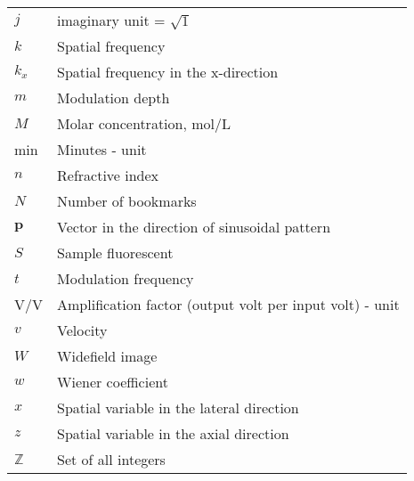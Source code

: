 \begin{flushleft}
\begin{longtable}[l]{|R{5.5em}|p{25em}|}
$j$               & imaginary unit = $\sqrt{1}$                       \\
$k$               & Spatial frequency                                 \\
$k_x$             & Spatial frequency in the x-direction              \\
$m$               & Modulation depth                                  \\
$M$               & Molar concentration, mol/L                        \\
min		          & Minutes - unit                                            \\
$n$               & Refractive index                                  \\
$N$               & Number of bookmarks                               \\
$\mathbf{p}$      & Vector in the direction of sinusoidal pattern    \\
$S$               & Sample fluorescent                                \\
$t$               & Modulation frequency                              \\
V/V 		      & Amplification factor (output volt per input volt) - unit \\
$v$               & Velocity                                          \\
$W$               & Widefield image                                   \\
$w$               & Wiener coefficient                                \\
$x$               & Spatial variable in the lateral direction         \\
$z$               & Spatial variable in the axial direction           \\
$\mathbb{Z}$      & Set of all integers                                           \\
\hline
\end{longtable}
\end{flushleft}